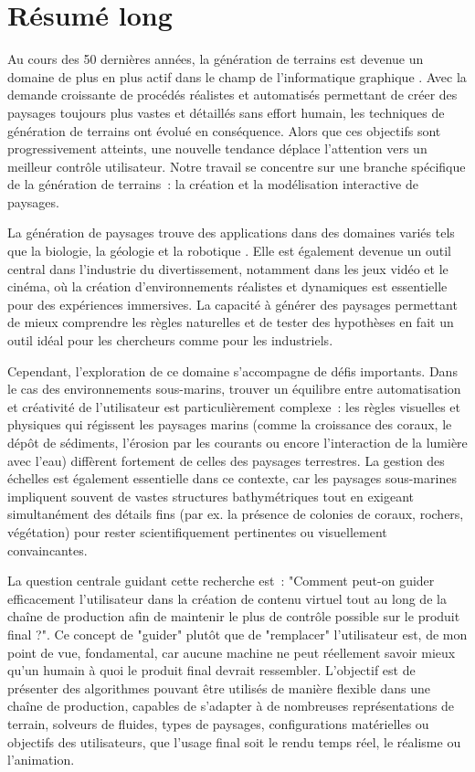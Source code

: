 \resetgraphicspath
{}

\chapter*{Résumé long}
Au cours des 50 dernières années, la génération de terrains est devenue un domaine de plus en plus actif dans le champ de l'informatique graphique \cite{Fournier1982,Musgrave1989,Miller1986,Galin2019}. Avec la demande croissante de procédés réalistes et automatisés permettant de créer des paysages toujours plus vastes et détaillés sans effort humain, les techniques de génération de terrains ont évolué en conséquence. Alors que ces objectifs sont progressivement atteints, une nouvelle tendance déplace l'attention vers un meilleur contrôle utilisateur. Notre travail se concentre sur une branche spécifique de la génération de terrains~: la création et la modélisation interactive de paysages.

La génération de paysages trouve des applications dans des domaines variés tels que la biologie, la géologie et la robotique \cite{Tzachor2023,Chen2023,Gerigk2025,Rudin2022}. Elle est également devenue un outil central dans l'industrie du divertissement, notamment dans les jeux vidéo et le cinéma, où la création d'environnements réalistes et dynamiques est essentielle pour des expériences immersives. La capacité à générer des paysages permettant de mieux comprendre les règles naturelles et de tester des hypothèses en fait un outil idéal pour les chercheurs comme pour les industriels.

Cependant, l'exploration de ce domaine s'accompagne de défis importants. Dans le cas des environnements sous-marins, trouver un équilibre entre automatisation et créativité de l'utilisateur est particulièrement complexe~: les règles visuelles et physiques qui régissent les paysages marins (comme la croissance des coraux, le dépôt de sédiments, l'érosion par les courants ou encore l'interaction de la lumière avec l'eau) diffèrent fortement de celles des paysages terrestres. La gestion des échelles est également essentielle dans ce contexte, car les paysages sous-marines impliquent souvent de vastes structures bathymétriques tout en exigeant simultanément des détails fins (par ex. la présence de colonies de coraux, rochers, végétation) pour rester scientifiquement pertinentes ou visuellement convaincantes.

La question centrale guidant cette recherche est~: "Comment peut-on guider efficacement l'utilisateur dans la création de contenu virtuel tout au long de la chaîne de production afin de maintenir le plus de contrôle possible sur le produit final ?". Ce concept de "guider" plutôt que de "remplacer" l'utilisateur est, de mon point de vue, fondamental, car aucune machine ne peut réellement savoir mieux qu'un humain à quoi le produit final devrait ressembler. L'objectif est de présenter des algorithmes pouvant être utilisés de manière flexible dans une chaîne de production, capables de s'adapter à de nombreuses représentations de terrain, solveurs de fluides, types de paysages, configurations matérielles ou objectifs des utilisateurs, que l'usage final soit le rendu temps réel, le réalisme ou l'animation.

